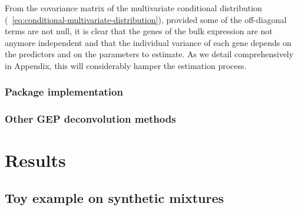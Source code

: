 \documentclass[long, final]{jobim}
\DeclareMathOperator*{\DET}{Det}
\begin{document}
From the covariance matrix of the multivariate conditional distribution (\equationname~\ref{eq:conditional-multivariate-distribution}), provided some of the off-diagonal terms are not null, it is clear that the genes of the bulk expression are not anymore independent and that the individual variance of each gene depends on the predictors and on the parameters to estimate. As we detail comprehensively in Appendix, this will considerably hamper the estimation process.




\subsubsection{Package implementation}
\label{subsubsec:implementation}

\subsubsection{Other GEP deconvolution methods}
\label{subsubsec:other-deconv-methods}

\section{Results}
\label{sec:results}

\subsection{Toy example on synthetic mixtures}
\label{subsec:sim-idealised}
\end{document}
